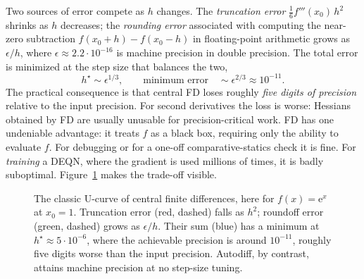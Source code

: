 \documentclass[11pt,a4paper]{report}
\begin{document}
Two sources of error compete as $h$ changes.  The \emph{truncation error} $\tfrac{1}{6}f'''(x_0)\,h^2$ shrinks as $h$ decreases; the \emph{rounding error} associated with computing the near-zero subtraction $f(x_0+h)-f(x_0-h)$ in floating-point arithmetic grows as $\epsilon/h$, where $\epsilon \approx 2.2\cdot 10^{-16}$ is machine precision in double precision.  The total error is minimized at the step size that balances the two,
\begin{equation}
h^\star \sim \epsilon^{1/3},\qquad\text{minimum error}\quad \sim \epsilon^{2/3} \approx 10^{-11}.
\end{equation}
The practical consequence is that central FD loses roughly \emph{five digits of precision} relative to the input precision.  For second derivatives the loss is worse: Hessians obtained by FD are usually unusable for precision-critical work.  FD has one undeniable advantage: it treats $f$ as a black box, requiring only the ability to evaluate $f$.  For debugging or for a one-off comparative-statics check it is fine.  For \emph{training} a DEQN, where the gradient is used millions of times, it is badly suboptimal.  Figure~\ref{fig:fd_ucurve} makes the trade-off visible.

\begin{figure}[ht]
\centering
{}
\caption{The classic U-curve of central finite differences, here for $f(x) = \mathrm{e}^x$ at $x_0 = 1$.  Truncation error (red, dashed) falls as $h^2$; roundoff error (green, dashed) grows as $\epsilon / h$.  Their sum (blue) has a minimum at $h^\star \approx 5 \cdot 10^{-6}$, where the achievable precision is around $10^{-11}$, roughly five digits worse than the input precision.  Autodiff, by contrast, attains machine precision at no step-size tuning.}
\label{fig:fd_ucurve}
\end{figure}
\end{document}
